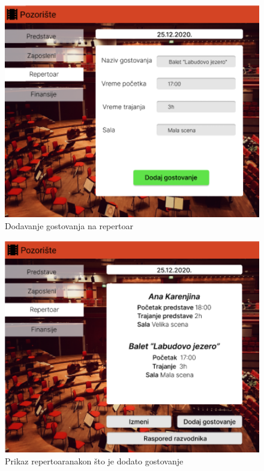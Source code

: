 \documentclass[a4paper]{article}
\begin{document}
\begin{figure}[H]
  \begin{center}
    \includegraphics[width=130mm]{../images/ui_dodavanje_gostovanja1.png}
  \end{center}
  \caption{Dodavanje gostovanja na repertoar}
  \label{dodavanje_gostovanja}
\end{figure}

\begin{figure}[H]
  \begin{center}
    \includegraphics[width=130mm]{../images/ui_dodavanje_gostovanja2.png}
  \end{center}
  \caption{Prikaz repertoaranakon što je dodato gostovanje}
  \label{dodato_gostovanje}
\end{figure}
\end{document}
